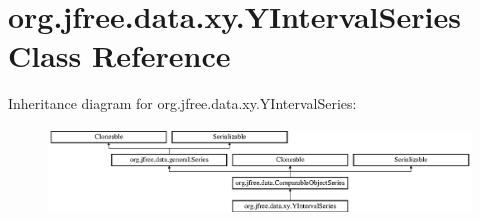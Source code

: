 \hypertarget{classorg_1_1jfree_1_1data_1_1xy_1_1_y_interval_series}{}\section{org.\+jfree.\+data.\+xy.\+Y\+Interval\+Series Class Reference}
\label{classorg_1_1jfree_1_1data_1_1xy_1_1_y_interval_series}
Inheritance diagram for org.\+jfree.\+data.\+xy.\+Y\+Interval\+Series\+:\begin{figure}[H]
\begin{center}
\leavevmode
\includegraphics[height=2.314049cm]{classorg_1_1jfree_1_1data_1_1xy_1_1_y_interval_series}
\end{center}
\end{figure}
